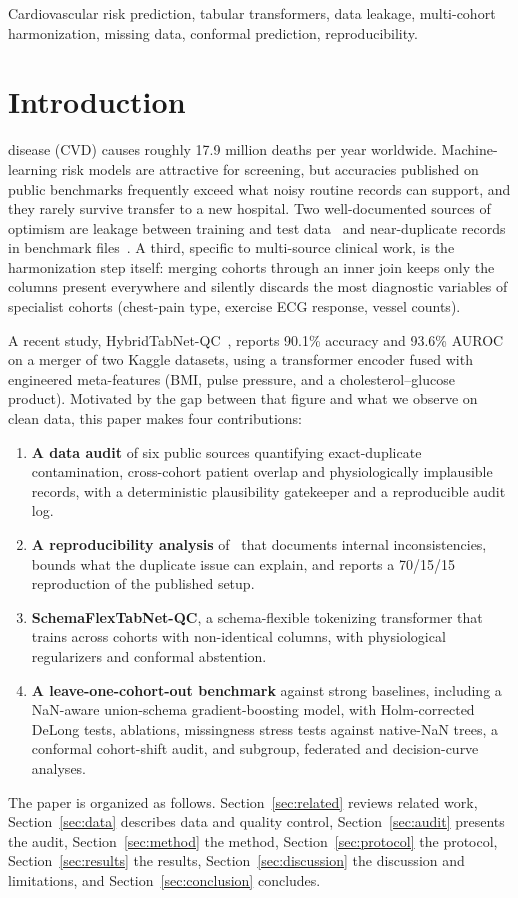 \documentclass[journal]{IEEEtran}
\newcommand{\sfn}{SchemaFlexTabNet-QC}
\newcommand{\htn}{HybridTabNet-QC}
\begin{document}
\begin{IEEEkeywords}
Cardiovascular risk prediction, tabular transformers, data leakage, multi-cohort harmonization, missing data, conformal prediction, reproducibility.
\end{IEEEkeywords}

\section{Introduction}
 disease (CVD) causes roughly 17.9 million deaths per year worldwide. Machine-learning risk models are attractive for screening, but accuracies published on public benchmarks frequently exceed what noisy routine records can support, and they rarely survive transfer to a new hospital. Two well-documented sources of optimism are leakage between training and test data~\cite{kapoor2023} and near-duplicate records in benchmark files~\cite{barz2020}. A third, specific to multi-source clinical work, is the harmonization step itself: merging cohorts through an inner join keeps only the columns present everywhere and silently discards the most diagnostic variables of specialist cohorts (chest-pain type, exercise ECG response, vessel counts).

A recent study, \htn{}~\cite{mahmud2026}, reports 90.1\% accuracy and 93.6\% AUROC on a merger of two Kaggle datasets, using a transformer encoder fused with engineered meta-features (BMI, pulse pressure, and a cholesterol--glucose product). Motivated by the gap between that figure and what we observe on clean data, this paper makes four contributions:
\begin{enumerate}
\item \textbf{A data audit} of six public sources quantifying exact-duplicate contamination, cross-cohort patient overlap and physiologically implausible records, with a deterministic plausibility gatekeeper and a reproducible audit log.
\item \textbf{A reproducibility analysis} of~\cite{mahmud2026} that documents internal inconsistencies, bounds what the duplicate issue can explain, and reports a 70/15/15 reproduction of the published setup.
\item \textbf{\sfn{}}, a schema-flexible tokenizing transformer that trains across cohorts with non-identical columns, with physiological regularizers and conformal abstention.
\item \textbf{A leave-one-cohort-out benchmark} against strong baselines, including a NaN-aware union-schema gradient-boosting model, with Holm-corrected DeLong tests, ablations, missingness stress tests against native-NaN trees, a conformal cohort-shift audit, and subgroup, federated and decision-curve analyses.
\end{enumerate}
The paper is organized as follows. Section~\ref{sec:related} reviews related work, Section~\ref{sec:data} describes data and quality control, Section~\ref{sec:audit} presents the audit, Section~\ref{sec:method} the method, Section~\ref{sec:protocol} the protocol, Section~\ref{sec:results} the results, Section~\ref{sec:discussion} the discussion and limitations, and Section~\ref{sec:conclusion} concludes.
\end{document}
